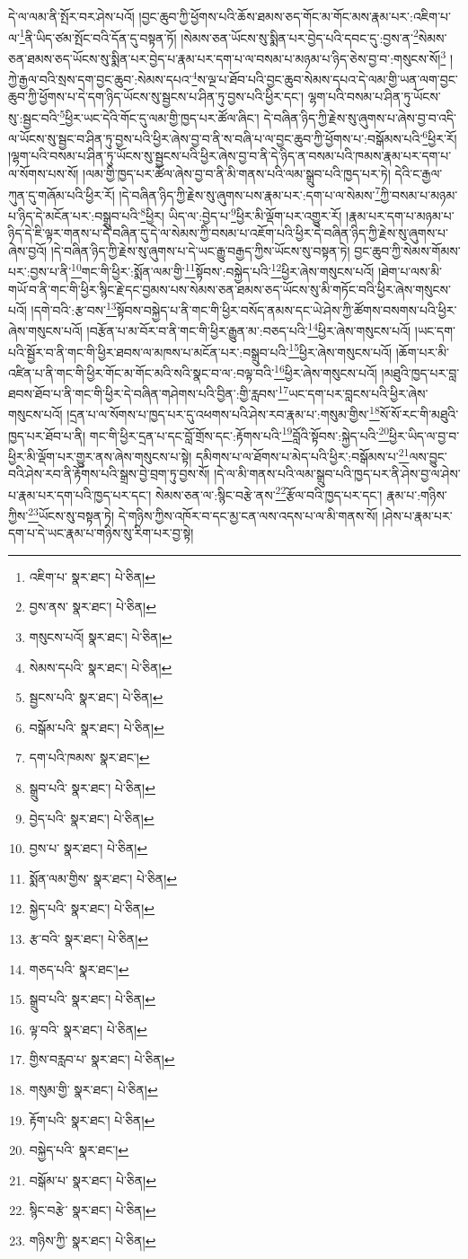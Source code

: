 དེ་ལ་ལམ་ནི་སྤོར་བར་ཤེས་པའོ། །བྱང་ཆུབ་ཀྱི་ཕྱོགས་པའི་ཆོས་ཐམས་ཅད་གོང་མ་གོང་མས་རྣམ་པར་:འཇིག་པ་ལ་\footnote{འཇིག་པ་  སྣར་ཐང་།  པེ་ཅིན། }ནི་ཡིད་ཙམ་སྤོང་བའི་དོན་དུ་བསྟན་ཏོ། །སེམས་ཅན་ཡོངས་སུ་སྨིན་པར་བྱེད་པའི་དབང་དུ་:བྱས་ན་\footnote{བྱས་ནས་  སྣར་ཐང་།  པེ་ཅིན། }སེམས་ཅན་ཐམས་ཅད་ཡོངས་སུ་སྨིན་པར་བྱེད་པ་རྣམ་པར་དག་པ་ལ་བསམ་པ་མཉམ་པ་ཉིད་ཅེས་བྱ་བ་:གསུངས་སོ།\footnote{གསུངས་པའོ།  སྣར་ཐང་།  པེ་ཅིན། } །ཀྱེ་རྒྱལ་བའི་སྲས་དག་བྱང་ཆུབ་:སེམས་དཔའ་\footnote{སེམས་དཔའི་  སྣར་ཐང་།  པེ་ཅིན། }ས་ལྔ་པ་ཐོབ་པའི་བྱང་ཆུབ་སེམས་དཔའ་དེ་ལམ་གྱི་ཡན་ལག་བྱང་ཆུབ་ཀྱི་ཕྱོགས་པ་དེ་དག་ཉིད་ཡོངས་སུ་སྦྱངས་པ་ཤིན་ཏུ་བྱས་པའི་ཕྱིར་དང་། ལྷག་པའི་བསམ་པ་ཤིན་ཏུ་ཡོངས་སུ་:སྦྱང་བའི་\footnote{སྦྱངས་པའི་  སྣར་ཐང་།  པེ་ཅིན། }ཕྱིར་ཡང་དེའི་གོང་དུ་ལམ་གྱི་ཁྱད་པར་ཚོལ་ཞིང་། དེ་བཞིན་ཉིད་ཀྱི་རྗེས་སུ་ཞུགས་པ་ཞེས་བྱ་བ་འདི་ལ་ཡོངས་སུ་སྦྱང་བ་ཤིན་ཏུ་བྱས་པའི་ཕྱིར་ཞེས་བྱ་བ་ནི་ས་བཞི་པ་ལ་བྱང་ཆུབ་ཀྱི་ཕྱོགས་པ་:བསྒོམས་པའི་\footnote{བསྒོམ་པའི་  སྣར་ཐང་།  པེ་ཅིན། }ཕྱིར་རོ། །ལྷག་པའི་བསམ་པ་ཤིན་ཏུ་ཡོངས་སུ་སྦྱངས་པའི་ཕྱིར་ཞེས་བྱ་བ་ནི་དེ་ཉིད་ན་བསམ་པའི་ཁམས་རྣམ་པར་དག་པ་ལ་སོགས་པས་སོ། །ལམ་གྱི་ཁྱད་པར་ཚོལ་ཞེས་བྱ་བ་ནི་མི་གནས་པའི་ལམ་སྒྲུབ་པའི་ཁྱད་པར་ཏེ། དེའི་ང་རྒྱལ་ཀུན་དུ་གཞོམ་པའི་ཕྱིར་རོ། །དེ་བཞིན་ཉིད་ཀྱི་རྗེས་སུ་ཞུགས་པས་རྣམ་པར་:དག་པ་ལ་སེམས་\footnote{དག་པའི་ཁམས་  སྣར་ཐང་། }ཀྱི་བསམ་པ་མཉམ་པ་ཉིད་དེ་མངོན་པར་:བསྒྲུབ་པའི་\footnote{སྒྲུབ་པའི་  སྣར་ཐང་།  པེ་ཅིན། }ཕྱིར། ཡིད་ལ་:བྱེད་པ་\footnote{བྱེད་པའི་  སྣར་ཐང་།  པེ་ཅིན། }ཕྱིར་མི་ལྡོག་པར་འགྱུར་རོ། །རྣམ་པར་དག་པ་མཉམ་པ་ཉིད་དེ་ཇི་ལྟར་གནས་པ་དེ་བཞིན་དུ་དེ་ལ་སེམས་ཀྱི་བསམ་པ་འཇོག་པའི་ཕྱིར་དེ་བཞིན་ཉིད་ཀྱི་རྗེས་སུ་ཞུགས་པ་ཞེས་བྱའོ། །དེ་བཞིན་ཉིད་ཀྱི་རྗེས་སུ་ཞུགས་པ་དེ་ཡང་རྒྱུ་བརྒྱད་ཀྱིས་ཡོངས་སུ་བསྟན་ཏེ། བྱང་ཆུབ་ཀྱི་སེམས་གོམས་པར་:བྱས་པ་ནི་\footnote{བྱས་པ་  སྣར་ཐང་།  པེ་ཅིན། }གང་གི་ཕྱིར་:སྨོན་ལམ་གྱི་\footnote{སྨོན་ལམ་གྱིས་  སྣར་ཐང་།  པེ་ཅིན། }སྟོབས་:བསྐྱེད་པའི་\footnote{སྐྱེད་པའི་  སྣར་ཐང་།  པེ་ཅིན། }ཕྱིར་ཞེས་གསུངས་པའོ། །ཐེག་པ་ལས་མི་གཡོ་བ་ནི་གང་གི་ཕྱིར་སྙིང་རྗེ་དང་བྱམས་པས་སེམས་ཅན་ཐམས་ཅད་ཡོངས་སུ་མི་གཏོང་བའི་ཕྱིར་ཞེས་གསུངས་པའོ། །དགེ་བའི་:རྩ་བས་\footnote{རྩ་བའི་  སྣར་ཐང་།  པེ་ཅིན། }སྟོབས་བསྐྱེད་པ་ནི་གང་གི་ཕྱིར་བསོད་ནམས་དང་ཡེ་ཤེས་ཀྱི་ཚོགས་བསགས་པའི་ཕྱིར་ཞེས་གསུངས་པའོ། །བརྩོན་པ་མ་བོར་བ་ནི་གང་གི་ཕྱིར་རྒྱུན་མ་:བཅད་པའི་\footnote{གཅད་པའི་  སྣར་ཐང་། }ཕྱིར་ཞེས་གསུངས་པའོ། །ཡང་དག་པའི་སྦྱོར་བ་ནི་གང་གི་ཕྱིར་ཐབས་ལ་མཁས་པ་མངོན་པར་:བསྒྲུབ་པའི་\footnote{སྒྲུབ་པའི་  སྣར་ཐང་།  པེ་ཅིན། }ཕྱིར་ཞེས་གསུངས་པའོ། །ཆོག་པར་མི་འཛིན་པ་ནི་གང་གི་ཕྱིར་གོང་མ་གོང་མའི་སའི་སྣང་བ་ལ་:བལྟ་བའི་\footnote{ལྟ་བའི་  སྣར་ཐང་།  པེ་ཅིན། }ཕྱིར་ཞེས་གསུངས་པའོ། །མཐུའི་ཁྱད་པར་བླ་ཐབས་ཐོབ་པ་ནི་གང་གི་ཕྱིར་དེ་བཞིན་གཤེགས་པའི་བྱིན་:གྱི་རླབས་\footnote{གྱིས་བརླབ་པ་  སྣར་ཐང་།  པེ་ཅིན། }ཡང་དག་པར་བླངས་པའི་ཕྱིར་ཞེས་གསུངས་པའོ། །དྲན་པ་ལ་སོགས་པ་ཁྱད་པར་དུ་འཕགས་པའི་ཤེས་རབ་རྣམ་པ་:གསུམ་གྱིས་\footnote{གསུམ་གྱི་  སྣར་ཐང་།  པེ་ཅིན། }སོ་སོ་རང་གི་མཐུའི་ཁྱད་པར་ཐོབ་པ་ནི། གང་གི་ཕྱིར་དྲན་པ་དང་བློ་གྲོས་དང་:རྟོགས་པའི་\footnote{རྟོག་པའི་  སྣར་ཐང་།  པེ་ཅིན། }བློའི་སྟོབས་:སྐྱེད་པའི་\footnote{བསྐྱེད་པའི་  སྣར་ཐང་། }ཕྱིར་ཡིད་ལ་བྱ་བ་ཕྱིར་མི་ལྡོག་པར་གྱུར་ནས་ཞེས་གསུངས་པ་སྟེ། དམིགས་པ་ལ་ཐོགས་པ་མེད་པའི་ཕྱིར་:བསྒོམས་པ་\footnote{བསྒོམ་པ་  སྣར་ཐང་།  པེ་ཅིན། }ལས་བྱུང་བའི་ཤེས་རབ་ནི་རྟོགས་པའི་སྒྲས་བྱེ་བྲག་ཏུ་བྱས་སོ། །དེ་ལ་མི་གནས་པའི་ལམ་སྒྲུབ་པའི་ཁྱད་པར་ནི་ཤེས་བྱ་ལ་ཤེས་པ་རྣམ་པར་དག་པའི་ཁྱད་པར་དང་། སེམས་ཅན་ལ་:སྙིང་བརྩེ་ནས་\footnote{སྙིང་བརྩེ་  སྣར་ཐང་།  པེ་ཅིན། }རྩོལ་བའི་ཁྱད་པར་དང་། རྣམ་པ་:གཉིས་ཀྱིས་\footnote{གཉིས་ཀྱི་  སྣར་ཐང་།  པེ་ཅིན། }ཡོངས་སུ་བསྟན་ཏེ། དེ་གཉིས་ཀྱིས་འཁོར་བ་དང་མྱ་ངན་ལས་འདས་པ་ལ་མི་གནས་སོ། །ཤེས་པ་རྣམ་པར་དག་པ་དེ་ཡང་རྣམ་པ་གཉིས་སུ་རིག་པར་བྱ་སྟེ། 